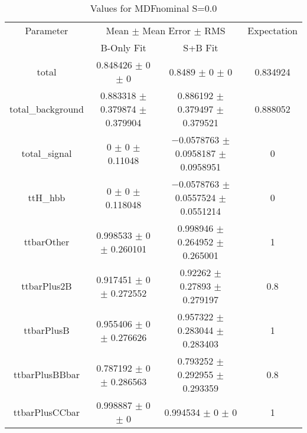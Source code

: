 \begin{table}
\centering
\caption{Values for MDFnominal S=0.0}
\begin{tabular}{cccc}
\toprule
Parameter & \multicolumn{2}{c}{Mean $\pm$ Mean Error $\pm$ RMS} & Expectation\\
 & B-Only Fit & S+B Fit & \\
\midrule
total & \num{0.848426} $\pm$ \num{0} $\pm$ \num{0} & \num{0.8489} $\pm$ \num{0} $\pm$ \num{0} & \num{0.834924}\\
total\_background & \num{0.883318} $\pm$ \num{0.379874} $\pm$ \num{0.379904} & \num{0.886192} $\pm$ \num{0.379497} $\pm$ \num{0.379521} & \num{0.888052}\\
total\_signal & \num{0} $\pm$ \num{0} $\pm$ \num{0.11048} & \num{-0.0578763} $\pm$ \num{0.0958187} $\pm$ \num{0.0958951} & \num{0}\\
ttH\_hbb & \num{0} $\pm$ \num{0} $\pm$ \num{0.118048} & \num{-0.0578763} $\pm$ \num{0.0557524} $\pm$ \num{0.0551214} & \num{0}\\
ttbarOther & \num{0.998533} $\pm$ \num{0} $\pm$ \num{0.260101} & \num{0.998946} $\pm$ \num{0.264952} $\pm$ \num{0.265001} & \num{1}\\
ttbarPlus2B & \num{0.917451} $\pm$ \num{0} $\pm$ \num{0.272552} & \num{0.92262} $\pm$ \num{0.27893} $\pm$ \num{0.279197} & \num{0.8}\\
ttbarPlusB & \num{0.955406} $\pm$ \num{0} $\pm$ \num{0.276626} & \num{0.957322} $\pm$ \num{0.283044} $\pm$ \num{0.283403} & \num{1}\\
ttbarPlusBBbar & \num{0.787192} $\pm$ \num{0} $\pm$ \num{0.286563} & \num{0.793252} $\pm$ \num{0.292955} $\pm$ \num{0.293359} & \num{0.8}\\
ttbarPlusCCbar & \num{0.998887} $\pm$ \num{0} $\pm$ \num{0} & \num{0.994534} $\pm$ \num{0} $\pm$ \num{0} & \num{1}\\
\bottomrule
\end{tabular}
\end{table}